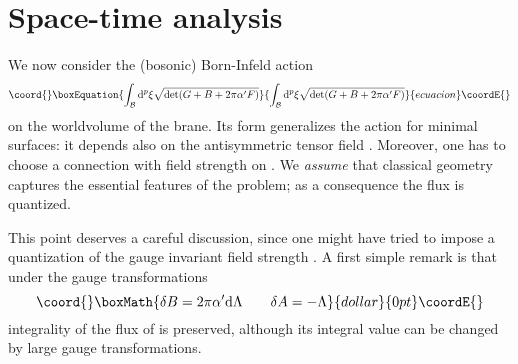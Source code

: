 \documentclass[a4paper,12pt]{article} \usepackage{amssymb,amsfonts,latexsym}
\begin{document}
\section{Space-time analysis}

We now consider the (bosonic) Born-Infeld action
\begin{equation}\coord{}\boxEquation{
\int_{\calb} \rmd^p \xi \sqrt{\det(G + B + 2\pi\alpha' F)} 
\label{dbi} }{
\int_{\calb} \rmd^p \xi \sqrt{\det(G + B + 2\pi\alpha' F)} 
}{ecuacion}\coordE{}\end{equation}
on the worldvolume \myHighlight{$\calb$}\coordHE{} of the brane. Its form generalizes the action for 
minimal surfaces: it depends also on the antisymmetric tensor field \coordHE{}. 
Moreover, one has to choose a connection \coordHE{} with field strength \coordHE{} on \myHighlight{$\calb$}\coordHE{}.
We {\em assume} that classical geometry captures the essential features of the 
problem; as a consequence the flux \coordHE{} is quantized.

This point deserves a careful discussion, since one might have tried
to impose a quantization of the gauge invariant field strength
\coordHE{}. A first simple remark is that under the
gauge transformations
$$\coord{}\boxMath{ \delta B = 2\pi\alpha'\rmd\Lambda \qquad \delta A = -\Lambda }{dollar}{0pt}\coordE{}$$
integrality of the flux of \coordHE{} is preserved, although its integral value
can be changed by large gauge transformations. 
\end{document}
